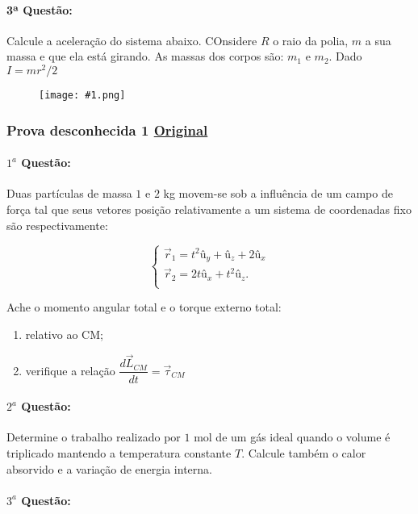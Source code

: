 \documentclass[12pt,a4paper]{article}
\newcommand{\original}[1]{\tiny \href{#1}{Original} \normalsize}
\newcommand{\img}[3]{\begin{figure}[#3]
\centering
\texttt{[image: \#1.png]}
\end{figure}}
\begin{document}
\paragraph{3ª Questão:} Calcule a aceleração do sistema abaixo. COnsidere $R$ o raio da polia, $m$ a sua massa e que ela está girando. As massas dos corpos são: $m_1$ e $m_2$. Dado $I = mr^2/2$

\img{fisicave21995q3}{4}{ht}

\newpage

\subsubsection{Prova desconhecida 1  \original{https://drive.google.com/open?id=12EiWTRicXqmxhjXmdcgk7hYXJgmdMiVY}}

\paragraph{$1^a$ Questão:} 

Duas partículas de massa $1$ e $2$ kg movem-se sob a influência de um campo de força tal que seus vetores posição relativamente a um sistema de coordenadas fixo são respectivamente:

$$
\begin{cases}
\overrightarrow{r}_1=t^2\textrm{û}_y + \textrm{û}_z+2\textrm{û}_x \\
\overrightarrow{r}_2=2t\textrm{û}_x+t^2\textrm{û}_z. \\
\end{cases}
$$

Ache o momento angular total e o torque externo total:

\begin{enumerate}[label=\alph*)]
\item relativo ao CM;
\item verifique a relação $\dfrac{d\overrightarrow{L}_{CM}}{dt}=\overrightarrow{\tau}_{CM}$
\end{enumerate}

\paragraph{$2^a$ Questão:}

Determine o trabalho realizado por $1$ mol de um gás ideal quando o volume é triplicado mantendo a temperatura constante $T$. Calcule também o calor absorvido e a variação de energia interna.

\paragraph{$3^a$ Questão:}
\end{document}

